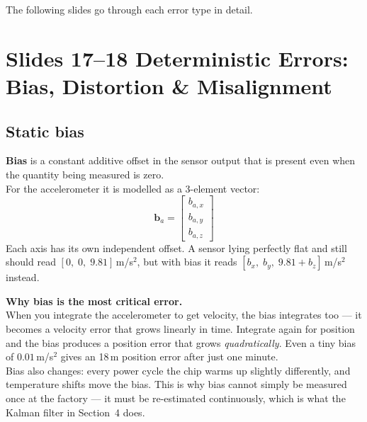 \documentclass[12pt, a4paper]{article}
\begin{document}
The following slides go through each error type in detail.

\section*{Slides 17--18 \quad Deterministic Errors: Bias, Distortion \& Misalignment}

\subsection*{Static bias}

\begin{defbox}
  \textbf{Bias} is a constant additive offset in the sensor output
  that is present even when the quantity being measured is zero.\\[4pt]
  For the accelerometer it is modelled as a 3-element vector:
  \[
    \mathbf{b}_a = \begin{bmatrix} b_{a,x} \\ b_{a,y} \\ b_{a,z} \end{bmatrix}
  \]
  Each axis has its own independent offset.
  A sensor lying perfectly flat and still should read
  $[0,\; 0,\; 9.81]$\,m/s$^2$, but with bias it reads
  $[b_x,\; b_y,\; 9.81 + b_z]$\,m/s$^2$ instead.
\end{defbox}

\begin{warnbox}
  \textbf{Why bias is the most critical error.}\\
  When you integrate the accelerometer to get velocity, the bias
  integrates too --- it becomes a velocity error that grows linearly
  in time.
  Integrate again for position and the bias produces a position error
  that grows \emph{quadratically}.
  Even a tiny bias of $0.01$\,m/s$^2$ gives an 18\,m position error
  after just one minute.\\[4pt]
  Bias also changes: every power cycle the chip warms up slightly
  differently, and temperature shifts move the bias.
  This is why bias cannot simply be measured once at the factory ---
  it must be re-estimated continuously, which is what the Kalman
  filter in Section~4 does.
\end{warnbox}

\end{document}
